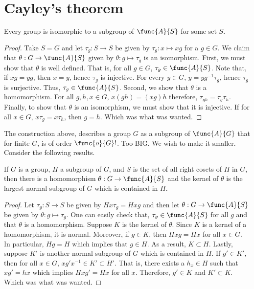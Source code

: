 \section{Cayley's theorem}
\begin{theorem}[Cayley]
    Every group is isomorphic to a subgroup of \(\func{A}{S}\) for some set \(S\).
\end{theorem}

\begin{proof}
    Take \(S = G\) and let \(\tau_g: S \to S\) be given by \(\tau_g: x \mapsto xg\) for a \(g \in G\). We claim that \(\theta: G \to \func{A}{S}\) given by \(\theta: g \mapsto \tau_g\) is an isomorphism. First, we must show that \(\theta\) is well defined. That is, for all \(g \in G\), \(\tau_g \in \func{A}{S}\). Note that, if \(xg = yg\), then \(x = y\), hence \(\tau_g\) is injective. For every \(y \in G\), \(y = yg^{-1} \tau_g\), hence \(\tau_g\) is surjective. Thus, \(\tau_g \in \func{A}{S}\). Second, we show that \(\theta\) is a homomorphism. For all \(g,h,x \in G\), \(x(gh) = (xg)h\) therefore, \(\tau_{gh} = \tau_g \tau_h\). Finally, to show that \(\theta\) is an isomorphism, we must show that it is injective. If for all \(x \in G\), \(x\tau_g = x\tau_h\), then \(g = h\). Which was what was wanted.
\end{proof}

The construction above, describes a group \(G\) as a subgroup of \(\func{A}{G}\) that for finite \(G\), is of order \(\func{o}{G}!\). Too BIG. We wish to make it smaller. Consider the following results.

\begin{theorem}
    If \(G\) is a group, \(H\) a subgroup of \(G\), and \(S\) is the set of all right cosets of \(H\) in \(G\), then there is a homomorphism \(\theta: G \to \func{A}{S}\) and the kernel of \(\theta\) is the largest normal subgroup of \(G\) which is contained in \(H\).
\end{theorem}

\begin{proof}
    Let \(\tau_g: S \to S\) be given by \(Hx \tau_g = Hxg\) and then let \(\theta: G \to \func{A}{S}\) be given by \(\theta: g \mapsto \tau_g\). One can easily check that, \(\tau_g \in \func{A}{S}\) for all \(g\) and that \(\theta\) is a homomorphism. Suppose \(K\) is the kernel of \(\theta\). Since \(K\) is a kernel of a homomorphism, it is normal. Moreover, if \(g \in K\), then \(Hxg = Hx\) for all \(x \in G\). In particular, \(Hg = H\) which implies that \(g \in H\). As a result, \(K \subset H\). Lastly, suppose \(K'\) is another normal subgroup of \(G\) which is contained in \(H\). If \(g' \in K'\), then for all \(x \in G\), \(xg' x^{-1} \in K' \subset H'\). That is, there exists a \(h_x \in H\) such that \(xg' = hx\) which implies \(Hxg' = Hx\) for all \(x\). Therefore, \(g' \in K\) and \(K' \subset K\). Which was what was wanted.
\end{proof}

